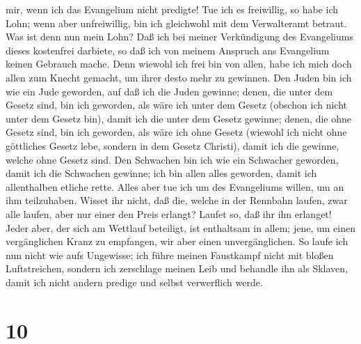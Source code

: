 mir, wenn ich das Evangelium nicht predigte!  Tue ich es
freiwillig, so habe ich Lohn; wenn aber unfreiwillig, bin ich gleichwohl
mit dem Verwalteramt betraut.  Was ist denn nun mein
Lohn? Daß ich bei meiner Verkündigung des Evangeliums dieses kostenfrei
darbiete, so daß ich von meinem Anspruch ans Evangelium keinen Gebrauch
mache.  Denn wiewohl ich frei bin von allen, habe ich
mich doch allen zum Knecht gemacht, um ihrer desto mehr zu gewinnen.
 Den Juden bin ich wie ein Jude geworden, auf daß ich die
Juden gewinne; denen, die unter dem Gesetz sind, bin ich geworden, als
wäre ich unter dem Gesetz (obschon ich nicht unter dem Gesetz bin),
damit ich die unter dem Gesetz gewinne;  denen, die ohne
Gesetz sind, bin ich geworden, als wäre ich ohne Gesetz (wiewohl ich
nicht ohne göttliches Gesetz lebe, sondern in dem Gesetz Christi), damit
ich die gewinne, welche ohne Gesetz sind.  Den Schwachen
bin ich wie ein Schwacher geworden, damit ich die Schwachen gewinne; ich
bin allen alles geworden, damit ich allenthalben etliche rette.
 Alles aber tue ich um des Evangeliums willen, um an ihm
teilzuhaben.  Wisset ihr nicht, daß die, welche in der
Rennbahn laufen, zwar alle laufen, aber nur einer den Preis erlangt?
Laufet so, daß ihr ihn erlanget!  Jeder aber, der sich am
Wettlauf beteiligt, ist enthaltsam in allem; jene, um einen
vergänglichen Kranz zu empfangen, wir aber einen unvergänglichen.
 So laufe ich nun nicht wie aufs Ungewisse; ich führe
meinen Faustkampf nicht mit bloßen Luftstreichen, 
sondern ich zerschlage meinen Leib und behandle ihn als Sklaven, damit
ich nicht andern predige und selbst verwerflich werde.

\hypertarget{section-9}{%
\section{10}\label{section-9}}


